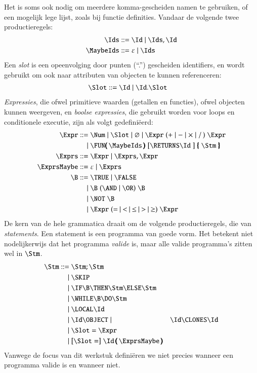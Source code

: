Het is soms ook nodig om meerdere komma-gescheiden namen te gebruiken, of een mogelijk lege lijst, zoals bij functie definities. Vandaar de volgende twee productieregels:
\begin{align*}
  \Ids \GrammarDef \Id \mid \Ids, \Id \\
  \MaybeIds \GrammarDef \varepsilon \mid \Ids
\end{align*}
Een \emph{slot}%
is een opeenvolging door punten (``.'') gescheiden identifiers,%
en wordt gebruikt om ook naar attributen van objecten te kunnen referenceren:%
\begin{align*}
  \Slot \GrammarDef \Id \mid \Id . \Slot
\end{align*}
\emph{Expressies}, die ofwel primitieve waarden (getallen en functies), ofwel objecten kunnen weergeven, en \emph{boolse expressies}, die gebruikt worden voor loops en conditionele executie, zijn als volgt gedefiniëerd:%
\begin{align*}
  \Expr \GrammarDef \Num \mid \Slot \mid \varnothing \mid \Expr\; (+ \mid - \mid \times \mid /\,)\; \Expr \\
  \GrammarOr \FUN\pmb{(}\,\MaybeIds\,\pmb{)}\; \GrammarOpt{\RETURNS \Id\;} \pmb{\{}\; \Stm\; \pmb{\}} \\
  \Exprs \GrammarDef \Expr \mid \Exprs, \Expr \\
  \ExprsMaybe \GrammarDef \varepsilon \mid \Exprs \\
  \B \GrammarDef \TRUE \mid \FALSE \\
  \GrammarOr \B\; (\AND \mid \OR)\; \B \\
  \GrammarOr \NOT\; \B \\
  \GrammarOr \Expr\; (=\: \mid\: <\: \mid\: \le\: \mid\: >\: \mid\: \ge)\; \Expr
\end{align*}
De kern van de hele grammatica draait om de volgende productieregels, die van \emph{statements}. Een statement is een programma van goede vorm. Het betekent niet nodelijkerwijs%
dat het programma \emph{valide} is, maar alle valide programma's zitten wel in $\Stm$.
\begin{align*}
  \Stm \GrammarDef \Stm; \Stm \\
  \GrammarOr \SKIP \\
  \GrammarOr \IF \B \THEN \Stm \ELSE \Stm \\
  \GrammarOr \WHILE \B \DO \Stm \\
  \GrammarOr \LOCAL \Id \\
  \GrammarOr \Id \OBJECT
  \GrammarOr \Id \CLONES \Id \\
  \GrammarOr \Slot = \Expr \\
  \GrammarOr \GrammarOpt{\Slot =} \Id\,\pmb{(}\,\ExprsMaybe\,\pmb{)} \\
\end{align*}
Vanwege de focus van dit werkstuk definiëren we niet precies wanneer een programma valide is en wanneer niet.

